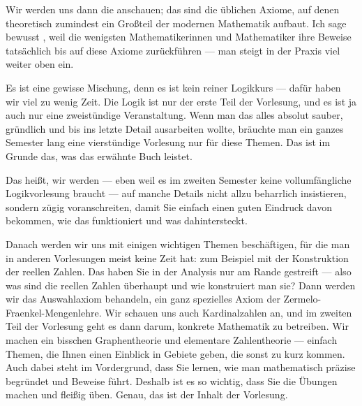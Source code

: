 \begin{spoken-clean}[00:15:56 - 00:18:19]
Wir werden uns dann die  anschauen; das sind die üblichen Axiome, auf denen theoretisch zumindest ein Großteil der modernen Mathematik aufbaut. Ich sage bewusst , weil die wenigsten Mathematikerinnen und Mathematiker ihre Beweise tatsächlich bis auf diese Axiome zurückführen --- man steigt in der Praxis viel weiter oben ein.

Es ist eine gewisse Mischung, denn es ist kein reiner Logikkurs --- dafür haben wir viel zu wenig Zeit. Die Logik ist nur der erste Teil der Vorlesung, und es ist ja auch nur eine zweistündige Veranstaltung. Wenn man das alles absolut sauber, gründlich und bis ins letzte Detail ausarbeiten wollte, bräuchte man ein ganzes Semester lang eine vierstündige Vorlesung nur für diese Themen. Das ist im Grunde das, was das erwähnte Buch leistet.

Das heißt, wir werden --- eben weil es im zweiten Semester keine vollumfängliche Logikvorlesung braucht --- auf manche Details nicht allzu beharrlich insistieren, sondern zügig voranschreiten, damit Sie einfach einen guten Eindruck davon bekommen, wie das funktioniert und was dahintersteckt.

Danach werden wir uns mit einigen wichtigen Themen beschäftigen, für die man in anderen Vorlesungen meist keine Zeit hat: zum Beispiel mit der Konstruktion der reellen Zahlen. Das haben Sie in der Analysis nur am Rande gestreift --- also was sind die reellen Zahlen überhaupt und wie konstruiert man sie? Dann werden wir das Auswahlaxiom behandeln, ein ganz spezielles Axiom der Zermelo-Fraenkel-Mengenlehre. Wir schauen uns auch Kardinalzahlen an, und im zweiten Teil der Vorlesung geht es dann darum, konkrete Mathematik zu betreiben. Wir machen ein bisschen Graphentheorie und elementare Zahlentheorie --- einfach Themen, die Ihnen einen Einblick in Gebiete geben, die sonst zu kurz kommen. Auch dabei steht im Vordergrund, dass Sie lernen, wie man mathematisch präzise begründet und Beweise führt. Deshalb ist es so wichtig, dass Sie die Übungen machen und fleißig üben. Genau, das ist der Inhalt der Vorlesung.
\end{spoken-clean}

\begin{ai-global-state-checkpoint-invisible-content}
\end{ai-global-state-checkpoint-invisible-content}

